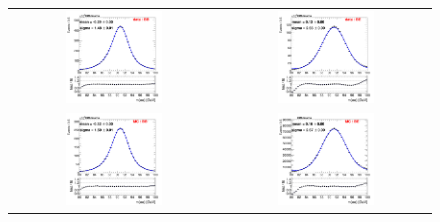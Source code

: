 \begin{figure}[ht]
  \begin{center}
    \begin{tabular}{cc}
      \includegraphics[width=0.48\textwidth]{figures/Zprime/2017/mass_resolution/data_BB_RunBCDEF} &
      \includegraphics[width=0.48\textwidth]{figures/Zprime/2017/mass_resolution/data_BE_RunBCDEF} \\
      \includegraphics[width=0.48\textwidth]{figures/Zprime/2017/mass_resolution/mc_BB} &
      \includegraphics[width=0.48\textwidth]{figures/Zprime/2017/mass_resolution/mc_BE}

\end{tabular}
\end{center}
\end{figure}
